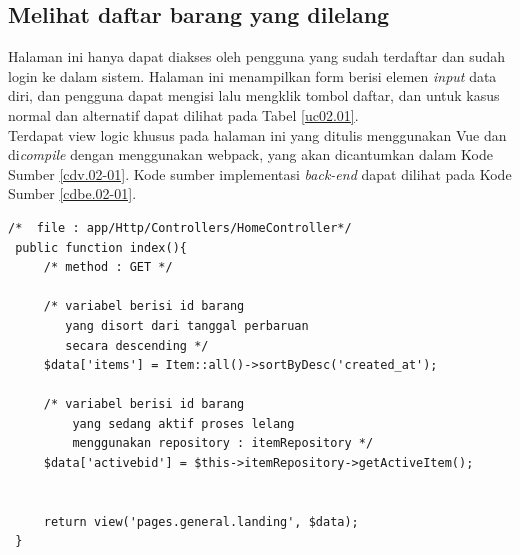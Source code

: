 \subsection{Melihat daftar barang yang dilelang}
Halaman ini hanya dapat diakses oleh pengguna yang sudah terdaftar dan sudah login ke dalam sistem. Halaman ini menampilkan form berisi elemen \textit{input} data diri, dan pengguna dapat mengisi lalu mengklik tombol daftar, dan untuk kasus normal dan alternatif dapat dilihat pada Tabel \ref{uc02.01}.\\
\indent Terdapat view logic khusus pada halaman ini yang ditulis menggunakan Vue dan di\textit{compile} dengan menggunakan webpack, yang akan dicantumkan dalam Kode Sumber \ref{cdv.02-01}. Kode sumber implementasi \textit{back-end} dapat dilihat pada Kode Sumber \ref{cdbe.02-01}.

\begin{lstlisting}[label=cdbe.02-01,style=php,caption=Kode Sumber \textit{Back-end} Melihat Daftar Barang]
/*	file : app/Http/Controllers/HomeController*/
 public function index(){
	 /*	method : GET */
	 
	 /*	variabel berisi id barang 
		yang disort dari tanggal perbaruan
		secara descending */
	 $data['items'] = Item::all()->sortByDesc('created_at');
	 
	 /*	variabel berisi id barang 
		 yang sedang aktif proses lelang
		 menggunakan repository : itemRepository */
	 $data['activebid'] = $this->itemRepository->getActiveItem();
	 

	 return view('pages.general.landing', $data);
 }
\end{lstlisting}

